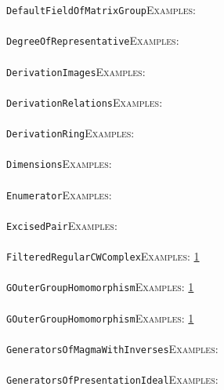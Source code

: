 \documentclass[a4paper,11pt]{report}
\begin{document}
{{ \texttt{DefaultFieldOfMatrixGroup}{\nobreakspace}{\nobreakspace}{\nobreakspace}{\nobreakspace}\textsc{Examples:} \\
 \\
 \texttt{DegreeOfRepresentative}{\nobreakspace}{\nobreakspace}{\nobreakspace}{\nobreakspace}\textsc{Examples:} \\
 \\
 \texttt{DerivationImages}{\nobreakspace}{\nobreakspace}{\nobreakspace}{\nobreakspace}\textsc{Examples:} \\
 \\
 \texttt{DerivationRelations}{\nobreakspace}{\nobreakspace}{\nobreakspace}{\nobreakspace}\textsc{Examples:} \\
 \\
 \texttt{DerivationRing}{\nobreakspace}{\nobreakspace}{\nobreakspace}{\nobreakspace}\textsc{Examples:} \\
 \\
 \texttt{Dimensions}{\nobreakspace}{\nobreakspace}{\nobreakspace}{\nobreakspace}\textsc{Examples:} \\
 \\
 \texttt{Enumerator}{\nobreakspace}{\nobreakspace}{\nobreakspace}{\nobreakspace}\textsc{Examples:} \\
 \\
 \texttt{ExcisedPair}{\nobreakspace}{\nobreakspace}{\nobreakspace}{\nobreakspace}\textsc{Examples:} \\
 \\
 \texttt{FilteredRegularCWComplex}{\nobreakspace}{\nobreakspace}{\nobreakspace}{\nobreakspace}\textsc{Examples:} \href{tutorial/chap4.html} {1}{\nobreakspace} \\
 \\
 \texttt{GOuterGroupHomomorphism}{\nobreakspace}{\nobreakspace}{\nobreakspace}{\nobreakspace}\textsc{Examples:} \href{../www/SideLinks/About/aboutCoefficientSequence.html} {1}{\nobreakspace} \\
 \\
 \texttt{GOuterGroupHomomorphism}{\nobreakspace}{\nobreakspace}{\nobreakspace}{\nobreakspace}\textsc{Examples:} \href{../www/SideLinks/About/aboutCoefficientSequence.html} {1}{\nobreakspace} \\
 \\
 \texttt{GeneratorsOfMagmaWithInverses}{\nobreakspace}{\nobreakspace}{\nobreakspace}{\nobreakspace}\textsc{Examples:} \\
 \\
 \texttt{GeneratorsOfPresentationIdeal}{\nobreakspace}{\nobreakspace}{\nobreakspace}{\nobreakspace}\textsc{Examples:} \\
}}
\end{document}

